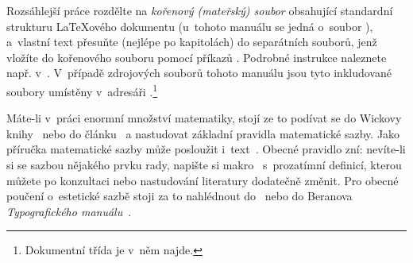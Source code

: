 Rozsáhlejší práce rozdělte na \emph{kořenový (mateřský) soubor} obsahující
standardní strukturu \LaTeX ového dokumentu
(u~tohoto manuálu se jedná o~soubor ), a~vlastní text
přesuňte (nejlépe po kapitolách) do separátních souborů, jenž vložíte do
kořenového souboru pomocí příkazů \verb!!. Podrobné instrukce
naleznete např.  v~\cite{Kop-Dal:2004:LaTeXPodrPruv:}. V~případě zdrojových
souborů tohoto manuálu jsou tyto inkludované soubory umístěny v~adresáři
.\footnote{Dokumentní třída  je v~něm najde.}


Máte-li v~práci enormní množství matematiky, stojí ze to podívat se do Wickovy
knihy~\cite{Wic:1966:PravMatSaz:} nebo do
článku~\cite{Hor:2001:ZprCSTUG:MathTypeset} a nastudovat základní pravidla
matematické sazby. Jako příručka matematické sazby může posloužit
i~text~\cite{Nec:2003::YetiTypoBest}. Obecné pravidlo zní: nevíte-li si se
sazbou nějakého prvku rady, napište si
makro~\cite{Kop-Dal:2004:LaTeXPodrPruv:} s~prozatímní definicí, kterou můžete
po konzultaci nebo nastudování literatury dodatečně změnit. Pro obecné poučení
o~estetické sazbě stoji za to nahlédnout do~\cite{Pop-Fle-Pop:1984:SazbaI:}
nebo do Beranova \emph{Typografického manuálu}~\cite{Ber:1999:TypoMan:}.

\endinput

